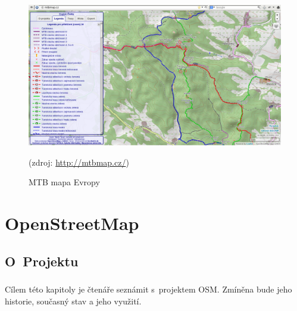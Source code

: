 \documentclass[11pt,a4paper,titlepage,oneside]{book}
\begin{document}
		\begin{figure}[!h]
			\begin{center}
				\includegraphics[width=12cm]{obrazky/mtb.png}
				\caption{MTB mapa Evropy}
				(zdroj: \url{http://mtbmap.cz/})
			\end{center}
		\end{figure}

\chapter{OpenStreetMap}
	\section{O~Projektu}

		\paragraph{} Cílem této kapitoly je čtenáře seznámit s~projektem \acl{OSM}. Zmíněna bude jeho historie, současný stav a jeho využití.



\end{document}
